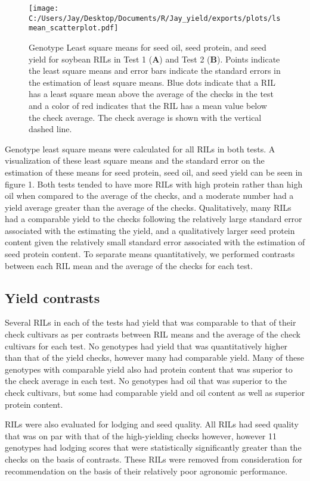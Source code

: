 \documentclass[Agronomy,article,submit,moreauthors,pdftex]{mdpi}
\begin{document}
\begin{figure}[H]
\centering
\texttt{[image: C:/Users/Jay/Desktop/Documents/R/Jay\_yield/exports/plots/lsmean\_scatterplot.pdf]}
\caption{Genotype Least square means for seed oil, seed protein, and seed yield for soybean RILs in Test 1 (\textbf{A}) and Test 2 (\textbf{B}). Points indicate the least square means and error bars indicate the standard errors in the estimation of least square means. Blue dots indicate that a RIL has a least square mean above the average of the checks in the test and a color of red indicates that the RIL has a mean value below the check average. The check average is shown with the vertical dashed line.}
\end{figure}

Genotype least square means were calculated for all RILs in both tests.
A visualization of these least square means and the standard error on
the estimation of these means for seed protein, seed oil, and seed yield
can be seen in figure 1. Both tests tended to have more RILs with high
protein rather than high oil when compared to the average of the checks,
and a moderate number had a yield average greater than the average of
the checks. Qualitatively, many RILs had a comparable yield to the
checks following the relatively large standard error associated with the
estimating the yield, and a qualitatively larger seed protein content
given the relatively small standard error associated with the estimation
of seed protein content. To separate means quantitatively, we performed
contrasts between each RIL mean and the average of the checks for each
test.

\hypertarget{yield-contrasts}{%
\subsection{Yield contrasts}\label{yield-contrasts}}

Several RILs in each of the tests had yield that was comparable to that
of their check cultivars as per contrasts between RIL means and the
average of the check cultivars for each test. No genotypes had yield
that was quantitatively higher than that of the yield checks, however
many had comparable yield. Many of these genotypes with comparable yield
also had protein content that was superior to the check average in each
test. No genotypes had oil that was superior to the check cultivars, but
some had comparable yield and oil content as well as superior protein
content.

RILs were also evaluated for lodging and seed quality. All RILs had seed
quality that was on par with that of the high-yielding checks however,
however 11 genotypes had lodging scores that were statistically
significantly greater than the checks on the basis of contrasts. These
RILs were removed from consideration for recommendation on the basis of
their relatively poor agronomic performance.
\end{document}

